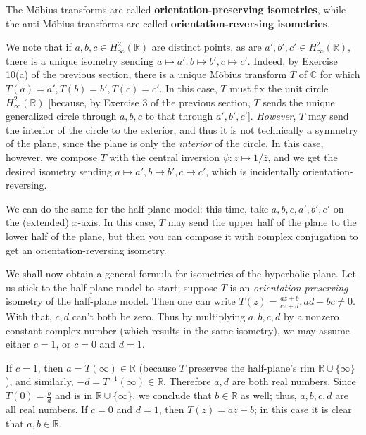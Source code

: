 \documentclass[leqno]{book}
\begin{document}
The M\"obius transforms are called \textbf{orientation-preserving isometries}, while the anti-M\"obius transforms are called \textbf{orientation-reversing isometries}.

We note that if $a,b,c\in H^2_\infty(\mathbb R)$ are distinct points, as are $a',b',c'\in H^2_\infty(\mathbb R)$, there is a unique isometry sending $a\mapsto a',b\mapsto b',c\mapsto c'$.    Indeed, by Exercise 10(a) of the previous section, there is a unique M\"obius transform $T$ of $\overline{\mathbb C}$ for which $T(a)=a',T(b)=b',T(c)=c'$.  In this case, $T$ must fix the unit circle $H^2_\infty(\mathbb R)$ [because, by Exercise 3 of the previous section, $T$ sends the unique generalized circle through $a,b,c$ to that through $a',b',c'$].  \emph{However}, $T$ may send the interior of the circle to the exterior, and thus it is not technically a symmetry of the plane, since the plane is only the \emph{interior} of the circle.  In this case, however, we compose $T$ with the central inversion $\psi:z\mapsto 1/\overline z$, and we get the desired isometry sending $a\mapsto a',b\mapsto b',c\mapsto c'$, which is incidentally orientation-reversing.

We can do the same for the half-plane model: this time, take $a,b,c,a',b',c'$ on the (extended) $x$-axis.  In this case, $T$ may send the upper half of the plane to the lower half of the plane, but then you can compose it with complex conjugation to get an orientation-reversing isometry.

We shall now obtain a general formula for isometries of the hyperbolic plane.  Let us stick to the half-plane model to start; suppose $T$ is an \emph{orientation-preserving} isometry of the half-plane model.  Then one can write $T(z)=\frac{az+b}{cz+d},ad-bc\ne 0$.  With that, $c,d$ can't both be zero.  Thus by multiplying $a,b,c,d$ by a nonzero constant complex number (which results in the same isometry), we may assume either $c=1$, or $c=0$ and $d=1$.

If $c=1$, then $a=T(\infty)\in\mathbb R$ (because $T$ preserves the half-plane's rim $\mathbb R\cup\{\infty\}$), and similarly, $-d=T^{-1}(\infty)\in\mathbb R$.  Therefore $a,d$ are both real numbers.  Since $T(0)=\frac bd$ and is in $\mathbb R\cup\{\infty\}$, we conclude that $b\in\mathbb R$ as well; thus, $a,b,c,d$ are all real numbers.  If $c=0$ and $d=1$, then $T(z)=az+b$; in this case it is clear that $a,b\in\mathbb R$.
\end{document}

